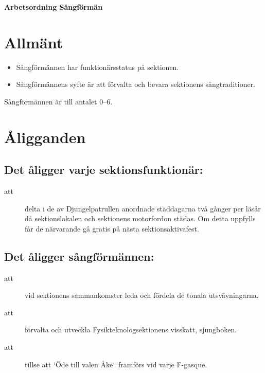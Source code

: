 
\renewcommand{\dateseparator}{-} %

\renewcommand{\forening}{Sångförmän}

\begin{center}
\LARGE{\textbf{Arbetsordning \forening}}
\end{center}



\section{Allmänt}
\begin{itemize}
\item Sångförmännen har funktionärsstatus på sektionen.

\item Sångförmännens syfte är att förvalta och bevara sektionens sångtraditioner.
\end{itemize}

Sångförmännen är till antalet 0--6.

\section{Åligganden}
\subsection{Det åligger varje sektionsfunktionär:}
    \begin{description}
      \item[att] delta i de av Djungelpatrullen anordnade städdagarna två gånger per
      läsår då sektionslokalen och sektionens motorfordon städas. Om detta uppfylls får de närvarande gå gratis på nästa
      sektionsaktivafest.
    \end{description}

\subsection{Det åligger sångförmännen:}

    \begin{description}
      \item[att] vid sektionens sammankomster leda och fördela de tonala ut\-sväv\-ning\-arna.
      \item[att] förvalta och utveckla Fysikteknologsektionens visskatt, sjungboken.
      \item[att] tillse att \char`\"Ode till valen Åke\char`\"\ framförs vid varje F-gasque.
    \end{description}



